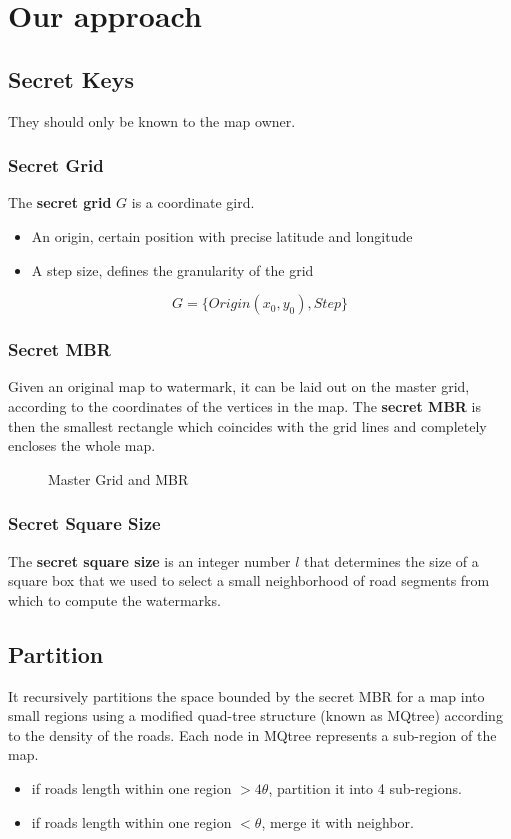 \documentclass[
	paper=128mm:96mm,	%
	fontsize=11pt,					%
	pagesize,							%
	parskip=half-,					%
	numbers=noendperiod,	%
	captions=nooneline			%
	]{scrartcl}							%
\theoremstyle{mythmstyle}
\begin{document}
\clearpage
%
%

%
%
\section{Our approach}
\subsection*{Secret Keys}
 They should only be known to the map owner.
\subsubsection*{Secret Grid}
The {\bf secret grid} $G$ is a coordinate gird. 
\begin{itemize}
\item An origin, certain position with precise latitude and longitude
\item A step size, defines the granularity of the grid
\end{itemize}
\[G=\{Origin(x_0, y_0), Step\}\]
\clearpage
\subsubsection*{Secret MBR}
Given an original map to watermark, it can be laid out on the master grid, 
according to the coordinates of the vertices in the map. 
The {\bf secret MBR} is then the smallest
rectangle which coincides with the grid lines and completely 
encloses the whole map.
\clearpage

\begin{figure}[h]
\centering
{}
\caption{Master Grid and MBR}
\label{fig:grid}
\end{figure}


\clearpage
\subsubsection*{Secret Square Size}
The {\bf secret square size} is an integer number $l$ that determines the size of a square box that we
used to select a small neighborhood of road segments from which to compute the watermarks.
\clearpage





\subsection*{Partition}
It recursively partitions the space bounded by the secret MBR for a map
into small regions using a modified quad-tree
structure (known as MQtree) according to the 
density of the roads. Each node in MQtree represents a sub-region of the map.
\begin{itemize}
\item if roads length within one region $> 4\theta$, partition it into 4 sub-regions.
\item if roads length within one region $< \theta$, merge it with neighbor.
\end{itemize}
\end{document}
